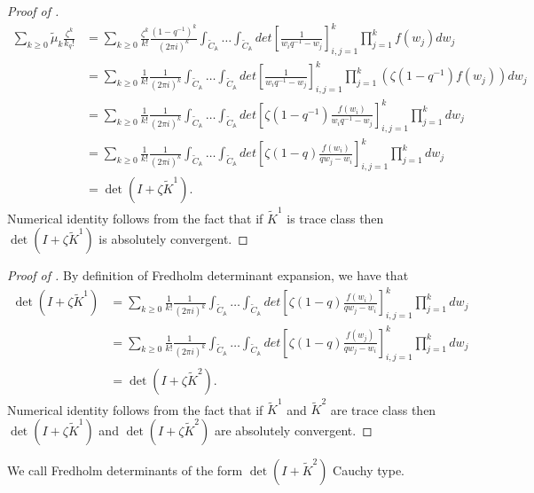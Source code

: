 \begin{proof}[Proof of ]
\begin{align*}
 \sum_{k \ge 0} \tilde{\mu}_k \frac{\zeta^k}{k_q!} &= \sum_{k \ge 0} \frac{\zeta^k}{k!} \frac{(1-q^{-1})^k}{(2 \pi i)^k} \int_{\tilde{C}_{\mathbb{A}}} \dots \int_{\tilde{C}_{\mathbb{A}}} det\left[ \frac{1}{w_i q^{-1} - w_j} \right]_{i,j=1}^k \prod_{j=1}^k f(w_j) dw_j \\
 &= \sum_{k \ge 0} \frac{1}{k!} \frac{1}{(2 \pi i)^k} \int_{\tilde{C}_{\mathbb{A}}} \dots \int_{\tilde{C}_{\mathbb{A}}} det\left[ \frac{1}{w_i q^{-1} - w_j} \right]_{i,j=1}^k \prod_{j=1}^k \left(\zeta (1-q^{-1}) f(w_j) \right) dw_j \\
 &= \sum_{k \ge 0} \frac{1}{k!} \frac{1}{(2 \pi i)^k} \int_{\tilde{C}_{\mathbb{A}}} \dots \int_{\tilde{C}_{\mathbb{A}}} det\left[ \zeta (1-q^{-1}) \frac{f(w_i)}{w_i q^{-1} - w_j} \right]_{i,j=1}^k \prod_{j=1}^k dw_j\\
 &= \sum_{k \ge 0} \frac{1}{k!} \frac{1}{(2 \pi i)^k} \int_{\tilde{C}_{\mathbb{A}}} \dots \int_{\tilde{C}_{\mathbb{A}}} det\left[ \zeta (1-q) \frac{f(w_i)}{qw_j - w_i} \right]_{i,j=1}^k \prod_{j=1}^k dw_j\\
 &= \det(I+\zeta \tilde{K}^1).
\end{align*}
Numerical identity follows from the fact that if $\tilde{K}^1$ is trace class then $\det(I+\zeta \tilde{K}^1)$ is absolutely convergent. 
\end{proof}

\begin{proof}[Proof of ]
By definition of Fredholm determinant expansion, we have that 
\begin{align*}
\det(I+\zeta \tilde{K}^1) &= \sum_{k \ge 0} \frac{1}{k!} \frac{1}{(2 \pi i)^k} \int_{\tilde{C}_{\mathbb{A}}} \dots \int_{\tilde{C}_{\mathbb{A}}} det\left[ \zeta (1-q) \frac{f(w_i)}{qw_j - w_i} \right]_{i,j=1}^k \prod_{j=1}^k dw_j \\
&= \sum_{k \ge 0} \frac{1}{k!} \frac{1}{(2 \pi i)^k} \int_{\tilde{C}_{\mathbb{A}}} \dots \int_{\tilde{C}_{\mathbb{A}}} det\left[ \zeta (1-q) \frac{f(w_j)}{qw_j - w_i} \right]_{i,j=1}^k \prod_{j=1}^k dw_j \\
&= \det(I+\zeta \tilde{K}^2).
\end{align*}
Numerical identity follows from the fact that if $\tilde{K}^1$ and $\tilde{K}^2$ are trace class then $\det(I+\zeta \tilde{K}^1)$ and $\det(I+\zeta \tilde{K}^2)$ are absolutely convergent. 
\end{proof}
We call Fredholm determinants of the form $\det(I+\tilde{K}^2)$ Cauchy type.

